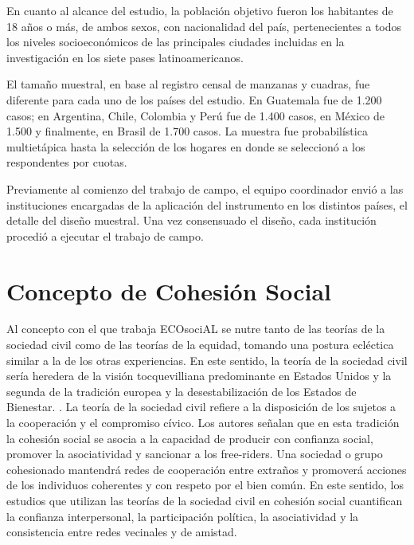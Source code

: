 \documentclass[
  12pt,
]{book}
\begin{document}
En cuanto al alcance del estudio, la población objetivo fueron los
habitantes de 18 años o más, de ambos sexos, con nacionalidad del país,
pertenecientes a todos los niveles socioeconómicos de las principales
ciudades incluidas en la investigación en los siete pases
latinoamericanos.

El tamaño muestral, en base al registro censal de manzanas y cuadras,
fue diferente para cada uno de los países del estudio. En Guatemala fue
de 1.200 casos; en Argentina, Chile, Colombia y Perú fue de 1.400 casos,
en México de 1.500 y finalmente, en Brasil de 1.700 casos. La muestra
fue probabilística multietápica hasta la selección de los hogares en
donde se seleccionó a los respondentes por cuotas.

Previamente al comienzo del trabajo de campo, el equipo coordinador envió a las instituciones encargadas de la aplicación del instrumento en los distintos países, el detalle del diseño muestral. Una vez consensuado el diseño, cada institución procedió a ejecutar el trabajo de campo.

\hypertarget{concepto-de-cohesiuxf3n-social}{%
\section{Concepto de Cohesión Social}\label{concepto-de-cohesiuxf3n-social}}

Al concepto con el que trabaja ECOsociAL se nutre tanto de las teorías de la sociedad civil como de las teorías de la equidad, tomando una postura ecléctica similar a la de los otras experiencias. En este sentido, la teoría de la sociedad civil sería heredera de la
visión tocquevilliana predominante en Estados Unidos y la segunda de la
tradición europea y la desestabilización de los Estados de Bienestar.
\citep{somma2015paradojas}. La teoría de la sociedad civil refiere a la disposición de los sujetos a la cooperación y el compromiso cívico. Los autores señalan que en esta tradición la cohesión social se asocia a la capacidad de producir con confianza social, promover la asociatividad y sancionar a los free-riders. Una sociedad o grupo cohesionado mantendrá redes de cooperación entre extraños y promoverá acciones de los individuos coherentes y con respeto por el bien común. En este sentido, los estudios que utilizan las teorías de la sociedad civil en cohesión social cuantifican la confianza interpersonal, la participación política, la asociatividad y la consistencia entre redes vecinales y de amistad.
\end{document}
